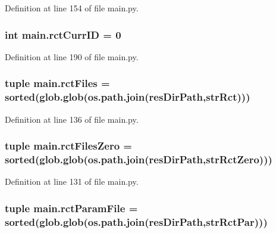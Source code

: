 Definition at line 154 of file main.\-py.

\hypertarget{a00111_a53e397dea15f17442a198395e65b377b}{
\subsubsection[{rct\-Curr\-I\-D}]{\setlength{\rightskip}{0pt plus 5cm}int main.\-rct\-Curr\-I\-D = 0}}\label{a00111_a53e397dea15f17442a198395e65b377b}


Definition at line 190 of file main.\-py.

\hypertarget{a00111_a9016a8f5eafe76e4e8dbb1bc3ce94af5}{
\subsubsection[{rct\-Files}]{\setlength{\rightskip}{0pt plus 5cm}tuple main.\-rct\-Files = sorted(glob.\-glob(os.\-path.\-join({\bf res\-Dir\-Path},{\bf str\-Rct})))}}\label{a00111_a9016a8f5eafe76e4e8dbb1bc3ce94af5}


Definition at line 136 of file main.\-py.

\hypertarget{a00111_aa37eddd86a00bf98dff8cc9260d6d13b}{
\subsubsection[{rct\-Files\-Zero}]{\setlength{\rightskip}{0pt plus 5cm}tuple main.\-rct\-Files\-Zero = sorted(glob.\-glob(os.\-path.\-join({\bf res\-Dir\-Path},{\bf str\-Rct\-Zero})))}}\label{a00111_aa37eddd86a00bf98dff8cc9260d6d13b}


Definition at line 131 of file main.\-py.

\hypertarget{a00111_ac4e9cba2fd0b813ba19029541ad609e5}{
\subsubsection[{rct\-Param\-File}]{\setlength{\rightskip}{0pt plus 5cm}tuple main.\-rct\-Param\-File = sorted(glob.\-glob(os.\-path.\-join({\bf res\-Dir\-Path},{\bf str\-Rct\-Par})))}}\label{a00111_ac4e9cba2fd0b813ba19029541ad609e5}


